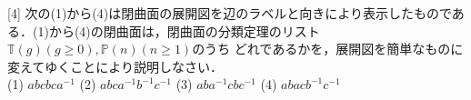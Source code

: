 \documentclass{jlreq}
\begin{document}
[4] 次の(1)から(4)は閉曲面の展開図を辺のラベルと向きにより表示したものである．(1)から(4)の閉曲面は，閉曲面の分類定理のリスト$\mathbb{T}(g) (g \geq 0), \mathbb{P}(n) (n \geq 1)$のうち
どれであるかを，展開図を簡単なものに変えてゆくことにより説明しなさい．\\
(1) $abcbca^{-1}$ \hspace{0.5cm} (2) $abca^{-1}b^{-1}c^{-1}$ \hspace{0.5cm} (3) $aba^{-1}cbc^{-1}$ \hspace{0.5cm} (4) $abacb^{-1}c^{-1}$
\end{document}
